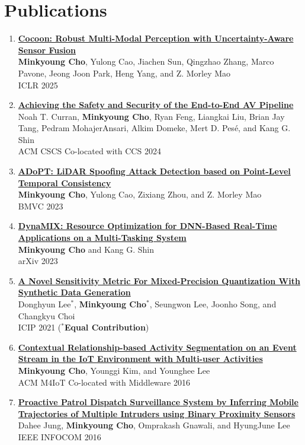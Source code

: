 \documentclass[letterpaper,oneside,11pt]{article}
\begin{document}
\section{Publications}
\begin{enumerate}[leftmargin=*, itemsep=0em]
  \item \small \textbf{\href{https://minkyoungcho.github.io/research/}{Cocoon: Robust Multi-Modal Perception with
  Uncertainty-Aware Sensor Fusion}} \\
  \textbf{Minkyoung Cho}, Yulong Cao, Jiachen Sun, Qingzhao Zhang, Marco Pavone, Jeong Joon Park, Heng Yang, and Z. Morley Mao\\ 
  ICLR 2025
  \item \small \textbf{\href{https://minkyoungcho.github.io/research/}{Achieving the Safety and Security of the End-to-End AV Pipeline}}\\
  Noah T. Curran, \textbf{Minkyoung Cho}, Ryan Feng, Liangkai Liu, Brian Jay Tang, Pedram MohajerAnsari, Alkim Domeke, Mert D. Pesé, and Kang G. Shin\\
  ACM CSCS Co-located with CCS 2024 
  \item \small \textbf{\href{https://arxiv.org/abs/2310.14504}{ADoPT: LiDAR Spoofing Attack Detection based on Point-Level Temporal Consistency}}\\
  \textbf{Minkyoung Cho}, Yulong Cao, Zixiang Zhou, and Z. Morley Mao\\
  BMVC 2023
  \item \small  \textbf{\href{https://arxiv.org/abs/2302.01568}{DynaMIX: Resource Optimization for DNN-Based Real-Time Applications on a Multi-Tasking System}}\\
  \textbf{Minkyoung Cho} and Kang G. Shin\\
  arXiv 2023
  \item \small \textbf{\href{https://ieeexplore.ieee.org/abstract/document/9506527}{A Novel Sensitivity Metric For Mixed-Precision Quantization With Synthetic Data Generation}}\\
  Donghyun Lee$^\ast$, \textbf{Minkyoung Cho$^\ast$}, Seungwon Lee, Joonho Song, and Changkyu Choi \\
  ICIP 2021 ($^\ast$\textbf{Equal Contribution})
  \item \small \textbf{\href{https://dl.acm.org/doi/10.1145/3008631.3008633}{Contextual Relationship-based Activity Segmentation on an Event Stream in the IoT Environment with Multi-user Activities}}\\
  \textbf{Minkyoung Cho}, Younggi Kim, and Younghee Lee\\
  ACM M4IoT Co-located with Middleware 2016
  \item \small \textbf{\href{https://ieeexplore.ieee.org/abstract/document/7524369}{Proactive Patrol Dispatch Surveillance System by Inferring Mobile Trajectories of Multiple Intruders using Binary Proximity Sensors}}\\
  Dahee Jung, \textbf{Minkyoung Cho}, Omprakash Gnawali, and HyungJune Lee\\  
  IEEE INFOCOM 2016
\end{enumerate}
\end{document}
